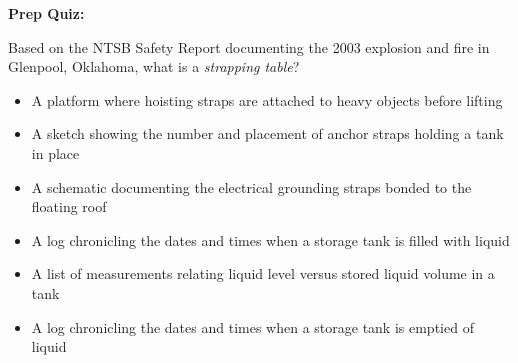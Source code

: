 \vfil \eject

\noindent
{\bf Prep Quiz:}

Based on the NTSB Safety Report documenting the 2003 explosion and fire in Glenpool, Oklahoma, what is a {\it strapping table}?

\begin{itemize}
\item{} A platform where hoisting straps are attached to heavy objects before lifting
\vskip 5pt 
\item{} A sketch showing the number and placement of anchor straps holding a tank in place
\vskip 5pt 
\item{} A schematic documenting the electrical grounding straps bonded to the floating roof
\vskip 5pt 
\item{} A log chronicling the dates and times when a storage tank is filled with liquid
\vskip 5pt 
\item{} A list of measurements relating liquid level versus stored liquid volume in a tank
\vskip 5pt 
\item{} A log chronicling the dates and times when a storage tank is emptied of liquid
\end{itemize}





